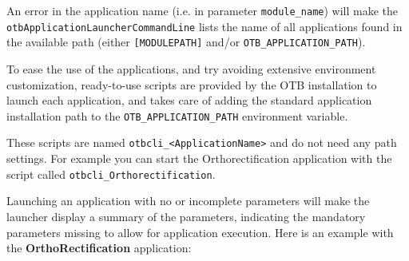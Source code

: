 An error in the application name (i.e. in parameter
\verb?module_name?) will make the
\verb?otbApplicationLauncherCommandLine? lists the name of all
applications found in the available path (either \verb?[MODULEPATH]? 
and/or \verb?OTB_APPLICATION_PATH?).

To ease the use of the applications, and try avoiding extensive environment
customization, ready-to-use scripts are provided by the OTB installation
to launch each application, and takes care of adding the standard application
installation path to the \verb?OTB_APPLICATION_PATH? environment variable.

These scripts are named \verb?otbcli_<ApplicationName>? and do not need any path
settings. For example you can start the Orthorectification application
with the script called \verb?otbcli_Orthorectification?.


Launching an application with no or incomplete parameters will make the
launcher display a summary of the parameters, indicating the mandatory parameters
missing to allow for application execution. Here is an example
with the \textbf{OrthoRectification} application:

